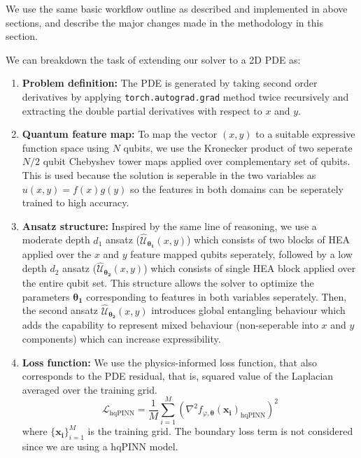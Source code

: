 \documentclass[11pt,a4paper]{article}
\begin{document}
{\vspace{1.5em}

We use the same basic workflow outline as described and implemented in above sections, and describe the major changes made in the methodology in this section.

We can breakdown the task of extending our solver to a 2D PDE as:

\begin{enumerate}
    \item \textbf{Problem definition:} The PDE is generated by taking second order derivatives by applying \texttt{torch.autograd.grad} method twice recursively and extracting the double partial derivatives with respect to $x$ and $y$.

    \item \textbf{Quantum feature map:} To map the vector $(x, y)$ to a suitable expressive function space using $N$ qubits, we use the Kronecker product of two seperate $N / 2$ qubit Chebyshev tower maps applied over complementary set of qubits. This is used because the solution is seperable in the two variables as $u(x,y) = f(x) g(y)$ so the features in both domains can be seperately trained to high accuracy.

    \item \textbf{Ansatz structure:} Inspired by the same line of reasoning, we use a moderate depth $d_1$ ansatz ($\mathcal{\hat{U}}_{\boldsymbol{\theta_1}}(x,y)$) which consists of two blocks of HEA applied over the $x$ and $y$ feature mapped qubits seperately, followed by a low depth $d_2$ ansatz ($\mathcal{\hat{U}}_{\boldsymbol{\theta_2}}(x,y)$) which consists of single HEA block applied over the entire qubit set. This structure allows the solver to optimize the parameters $\boldsymbol{\theta_1}$ corresponding to features in both variables seperately. Then, the second ansatz $\mathcal{\hat{U}}_{\boldsymbol{\theta_2}}(x,y)$ introduces global entangling behaviour which adds the capability to represent mixed behaviour (non-seperable into $x$ and $y$ components) which can increase expressibility.

    \item \textbf{Loss function:} We use the physics-informed loss function, that also corresponds to the PDE residual, that is, squared value of the Laplacian averaged over the training grid.
    $$
    \mathcal{L}_{\text{hqPINN}} = \frac{1}{M} \sum_{i=1}^{M} (\nabla^2 f_{\varphi,\boldsymbol{\theta}}(\boldsymbol{x_i})_{\text{hqPINN}})^2
    $$
    where $\{\boldsymbol{x_i}\}_{i=1}^{M}$ is the training grid.
    The boundary loss term is not considered since we are using a hqPINN model.


\end{enumerate}}
\end{document}
